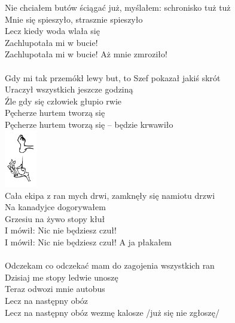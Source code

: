\documentclass[a5paper, 10pt]{book}
\begin{document}
\begin{minipage}[b]{0.8\textwidth}
Nie chciałem butów ściągać już, myślałem: schronisko tuż tuż\\
Mnie się spieszyło, strasznie spieszyło		\\
\hspace*{5mm}Lecz kiedy woda wlała się				\\
\hspace*{5mm}Zachlupotała mi w bucie!					\\
\hspace*{5mm}Zachlupotała mi w bucie! Aż mnie zmroziło!\\
\\
Gdy mi tak przemókł lewy but, to Szef pokazał jakiś skrót\\
Uraczył wszystkich jeszcze godziną\\
\hspace*{5mm}Źle gdy się człowiek głupio rwie\\
\hspace*{5mm}Pęcherze hurtem tworzą się\\
\hspace*{5mm}Pęcherze hurtem tworzą się – będzie krwawiło\\
\includegraphics[height=2.5cm,right]{images/stopa_dejwa.png}\vspace*{-2.6cm}\\

Cała ekipa z ran mych drwi, zamknęły się namiotu drzwi\\
Na kanadyjce dogorywałem\\
\hspace*{5mm}Grzesiu na żywo stopy kłuł\\
\hspace*{5mm}I mówił: Nic nie będziesz czuł!\\
\hspace*{5mm}I mówił: Nic nie będziesz czuł! A ja płakałem\\
\\
Odczekam co odczekać mam do zagojenia wszystkich ran\\
Dzisiaj me stopy ledwie unoszę\\
\hspace*{5mm}Teraz odwozi mnie autobus\\
\hspace*{5mm}Lecz na następny obóz\\
\hspace*{5mm}Lecz na następny obóz wezmę kalosze /już się nie zgłoszę/\\
\end{minipage}
\end{document}
